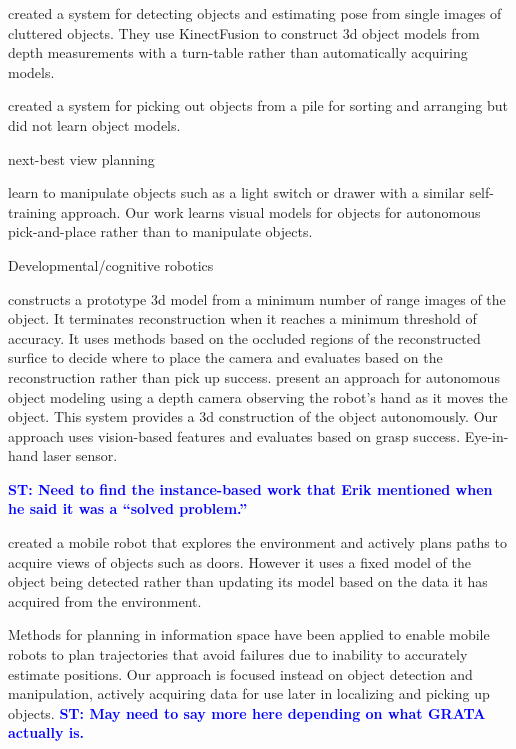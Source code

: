 \documentclass{article}
\newcommand{\stnote}[1]{\textcolor{blue}{\textbf{ST: #1}}}
\begin{document}
\citet{zhu14} created a system for detecting objects and estimating
pose from single images of cluttered objects.  They use KinectFusion
to construct 3d object models from depth measurements with a
turn-table rather than automatically acquiring models.

\citet{chang12} created a system for picking out objects from a pile
for sorting and arranging but did not learn object models.  

next-best view planning~\citep{kriegel11}

\citet{nguyen14} learn to manipulate objects such as a light switch or
drawer with a similar self-training approach.  Our work learns visual
models for objects for autonomous pick-and-place rather than to
manipulate objects.

Developmental/cognitive robotics~\citep{lyubova13, kraft10r}

\citet{banta00} constructs a prototype 3d model from a minimum number
of range images of the object.  It terminates reconstruction when it
reaches a minimum threshold of accuracy.  It uses methods based on the
occluded regions of the reconstructed surfice to decide where to place
the camera and evaluates based on the reconstruction rather than pick
up success.  \citet{krainin11} present an approach for autonomous
object modeling using a depth camera observing the robot's hand as it
moves the object.  This system provides a 3d construction of the
object autonomously.  Our approach uses vision-based features and
evaluates based on grasp success.  Eye-in-hand laser
sensor.~\citep{aeotti14}

\stnote{Need to find the instance-based work that Erik mentioned when
  he said it was a ``solved problem.''}

\citet{velez11} created a mobile robot that explores the environment
and actively plans paths to acquire views of objects such as doors.
However it uses a fixed model of the object being detected rather than
updating its model based on the data it has acquired from the
environment.

Methods for planning in information space \citep{he08, atanasov13,
  prentice09} have been applied to enable mobile robots to plan
trajectories that avoid failures due to inability to accurately
estimate positions.  Our approach is focused instead on
object detection and manipulation, actively acquiring data for use
later in localizing and picking up objects. \stnote{May need to say
  more here depending on what GRATA actually is.}
\end{document}
